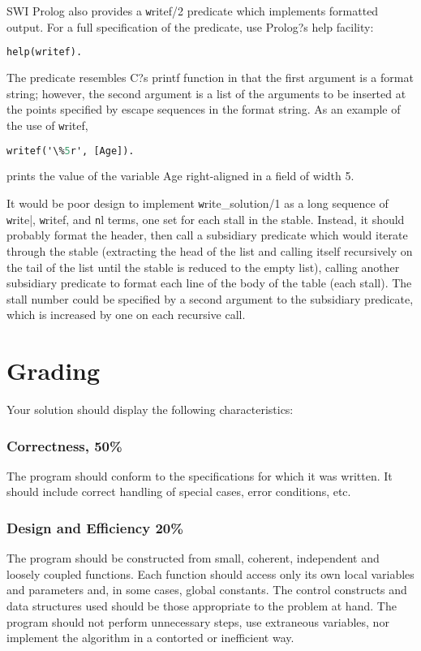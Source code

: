 \documentclass[12pt,info]{asg}
\begin{document}
SWI Prolog also provides a {\texttt writef/2} predicate which implements formatted output. For a full
specification of the predicate, use Prolog?s help facility:
\begin{lstlisting}[language=Lisp]
   help(writef).
\end{lstlisting}
The predicate resembles C?s printf function in that the first argument is a format string; however, the second argument is a list of the arguments to be inserted at the points specified by escape sequences in the format string.
As an example of the use of {\texttt writef}, 
 
\begin{lstlisting}[language=Lisp]
 writef('\%5r', [Age]).
\end{lstlisting}
 
prints the value of the variable Age right-aligned in a field of width 5.

It would be poor design to implement {\texttt write_solution/1} as a long sequence of {\texttt write|}, {\texttt writef}, and {\texttt nl} terms, one set for each stall in the stable. Instead, it should probably format the header, then call a subsidiary predicate which would iterate through the stable (extracting the head of the list and calling itself recursively on the tail of the list until the stable is reduced to the empty list), calling another subsidiary predicate to format each line of the body of the table (each stall). The stall number could be specified by a second argument to the subsidiary predicate, which is increased by one on each recursive call.
 
\section*{Grading}
Your solution should display the following characteristics:
\subsubsection*{Correctness, 50\%}
The program should conform to the specifications for which it was written. It should include correct handling of special cases, error conditions, etc.
\subsubsection*{Design and Efficiency 20\%} The program should be constructed from small, coherent, independent and loosely coupled functions. Each function should access only its own local variables and parameters and, in some cases, global constants. The control constructs and data structures used should be those appropriate to the problem at hand. The program should not perform unnecessary steps, use extraneous variables, nor implement the algorithm in a contorted or inefficient way.
\end{document}
